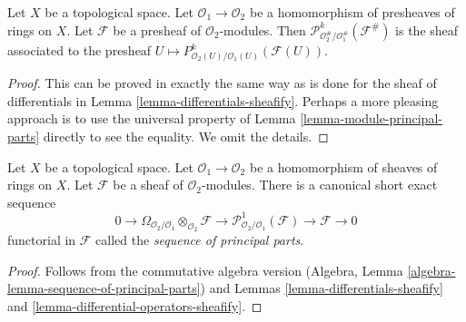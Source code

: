 \begin{lemma}
\label{lemma-differential-operators-sheafify}
Let $X$ be a topological space. Let $\mathcal{O}_1 \to \mathcal{O}_2$
be a homomorphism of presheaves of rings on $X$. Let $\mathcal{F}$ be a
presheaf of $\mathcal{O}_2$-modules. Then
$\mathcal{P}^k_{\mathcal{O}_2^\#/\mathcal{O}_1^\#}(\mathcal{F}^\#)$
is the sheaf associated to the presheaf
$U \mapsto P^k_{\mathcal{O}_2(U)/\mathcal{O}_1(U)}(\mathcal{F}(U))$.
\end{lemma}

\begin{proof}
This can be proved in exactly the same way as is done for the sheaf
of differentials in Lemma \ref{lemma-differentials-sheafify}.
Perhaps a more pleasing approach is to use the universal property
of Lemma \ref{lemma-module-principal-parts} directly to see the equality.
We omit the details.
\end{proof}

\begin{lemma}
\label{lemma-sequence-of-principal-parts}
Let $X$ be a topological space. Let $\mathcal{O}_1 \to \mathcal{O}_2$
be a homomorphism of sheaves of rings on $X$. Let $\mathcal{F}$ be a
sheaf of $\mathcal{O}_2$-modules. There is a
canonical short exact sequence
$$
0 \to
\Omega_{\mathcal{O}_2/\mathcal{O}_1} \otimes_{\mathcal{O}_2} \mathcal{F} \to
\mathcal{P}^1_{\mathcal{O}_2/\mathcal{O}_1}(\mathcal{F}) \to
\mathcal{F} \to 0
$$
functorial in $\mathcal{F}$ called the {\it sequence of principal parts}.
\end{lemma}

\begin{proof}
Follows from the commutative algebra version
(Algebra, Lemma \ref{algebra-lemma-sequence-of-principal-parts})
and Lemmas \ref{lemma-differentials-sheafify} and
\ref{lemma-differential-operators-sheafify}.
\end{proof}


